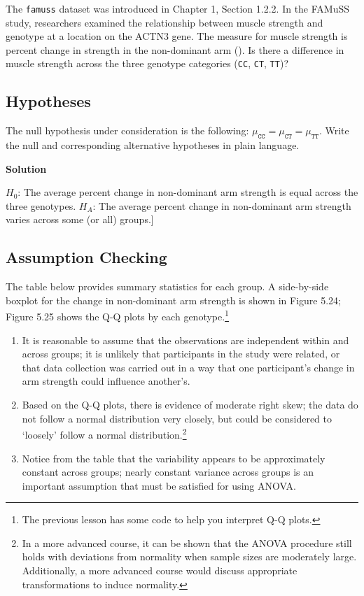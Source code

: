 \documentclass[
  letterpaper,
  DIV=11,
  numbers=noendperiod,
  oneside]{scrreprt}
\providecommand{\tightlist}{%
  \setlength{\itemsep}{0pt}\setlength{\parskip}{0pt}}\usepackage{longtable,booktabs,array}
\begin{document}
The \texttt{famuss} dataset was introduced in Chapter 1, Section 1.2.2.
In the FAMuSS study, researchers examined the relationship between
muscle strength and genotype at a location on the ACTN3 gene. The
measure for muscle strength is percent change in strength in the
non-dominant arm (). Is there a difference in muscle
strength across the three genotype categories (\texttt{CC}, \texttt{CT},
\texttt{TT})?

\hypertarget{hypotheses}{%
\subsection{Hypotheses}\label{hypotheses}}

The null hypothesis under consideration is the following:
\(\mu_{\texttt{CC}} = \mu_{\texttt{CT}} = \mu_{\texttt{TT}}\). Write the
null and corresponding alternative hypotheses in plain language.

\textbf{Solution}

\(H_0\): The average percent change in non-dominant arm strength is
equal across the three genotypes. \(H_A\): The average percent change in
non-dominant arm strength varies across some (or all) groups.{]}

\hypertarget{assumption-checking}{%
\subsection{Assumption Checking}\label{assumption-checking}}

The table below provides summary statistics for each group. A
side-by-side boxplot for the change in non-dominant arm strength is
shown in Figure 5.24; Figure 5.25 shows the Q-Q plots by each
genotype.\footnote{The previous lesson has some code to help you
  interpret Q-Q plots.}

\begin{enumerate}
\def\labelenumi{\arabic{enumi}.}
\tightlist
\item
  It is reasonable to assume that the observations are independent
  within and across groups; it is unlikely that participants in the
  study were related, or that data collection was carried out in a way
  that one participant's change in arm strength could influence
  another's.
\item
  Based on the Q-Q plots, there is evidence of moderate right skew; the
  data do not follow a normal distribution very closely, but could be
  considered to `loosely' follow a normal distribution.\footnote{In a
    more advanced course, it can be shown that the ANOVA procedure still
    holds with deviations from normality when sample sizes are
    moderately large. Additionally, a more advanced course would discuss
    appropriate transformations to induce normality.}
\item
  Notice from the table that the variability appears to be approximately
  constant across groups; nearly constant variance across groups is an
  important assumption that must be satisfied for using ANOVA.
\end{enumerate}
\end{document}

